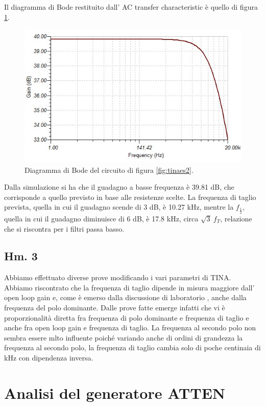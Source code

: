 \documentclass[journal, a4paper]{IEEEtran}
\begin{document}
Il diagramma di Bode restituito dall' AC transfer characteristic è quello di figura \ref{fig:tina_es2_bode}.

\begin{figure}[htp]
\includegraphics[scale=0.4]{tina_es2_bode}
\caption{Diagramma di Bode del circuito di figura \ref{fig:tinaes2}.}
\label{fig:tina_es2_bode}
\end{figure}

Dalla simulazione si ha che il guadagno a basse frequenza è 39.81 dB, che corrisponde a quello previsto in base alle resistenze scelte. La frequenza di taglio prevista, quella in cui il guadagno scende di 3 dB, è 10.27 kHz, mentre la $f_{\frac{1}{2}}$, quella in cui il guadagno diminuisce di 6 dB, è 17.8 kHz, circa $\sqrt{3}~f_T$, relazione che si riscontra per i filtri passa basso.

\subsection{Hm. 3}
Abbiamo effettuato diverse prove modificando i vari parametri di TINA. Abbiamo riscontrato che la frequenza di taglio dipende in misura maggiore dall' open loop gain e, come è emerso dalla discussione di laboratorio
, anche dalla frequenza del polo dominante. Dalle prove fatte emerge infatti che vi è proporzionalità diretta fra frequenza di polo dominante e frequenza di taglio e anche fra open loop gain e frequenza di taglio. La frequenza al secondo polo non sembra essere mlto influente poiché variando anche di ordini di grandezza la frequenza al secondo polo, la frequenza di taglio cambia solo di poche centinaia di kHz con dipendenza inversa.

\section{Analisi del generatore ATTEN}
\end{document}
